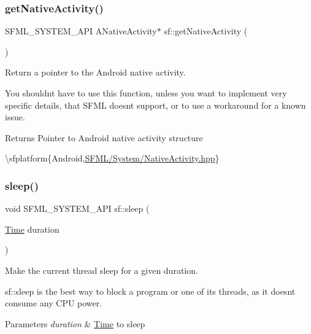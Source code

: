 \subsubsection{\texorpdfstring{getNativeActivity()}{getNativeActivity()}}
{\footnotesize\ttfamily S\+F\+M\+L\+\_\+\+S\+Y\+S\+T\+E\+M\+\_\+\+A\+PI A\+Native\+Activity$\ast$ sf\+::get\+Native\+Activity (\begin{DoxyParamCaption}{ }\end{DoxyParamCaption})}



Return a pointer to the Android native activity. 

You shouldn\textquotesingle{}t have to use this function, unless you want to implement very specific details, that S\+F\+ML doesn\textquotesingle{}t support, or to use a workaround for a known issue.

\begin{DoxyReturn}{Returns}
Pointer to Android native activity structure
\end{DoxyReturn}
\textbackslash{}sfplatform\{Android,\mbox{\hyperlink{_native_activity_8hpp_source}{S\+F\+M\+L/\+System/\+Native\+Activity.\+hpp}}\} \begin{DoxyVerb}\end{DoxyVerb}
 \mbox{\label{group__system_ga2f2620831533dee0ed432ed982342e09}} 
\subsubsection{\texorpdfstring{sleep()}{sleep()}}
{\footnotesize\ttfamily void S\+F\+M\+L\+\_\+\+S\+Y\+S\+T\+E\+M\+\_\+\+A\+PI sf\+::sleep (\begin{DoxyParamCaption}\item[{\mbox{\hyperlink{classsf_1_1_time}{Time}}}]{duration }\end{DoxyParamCaption})}



Make the current thread sleep for a given duration. 

sf\+::sleep is the best way to block a program or one of its threads, as it doesn\textquotesingle{}t consume any C\+PU power.


\begin{DoxyParams}{Parameters}
{\em duration} & \mbox{\hyperlink{classsf_1_1_time}{Time}} to sleep \begin{DoxyVerb}\end{DoxyVerb}
 \\
\hline
\end{DoxyParams}
